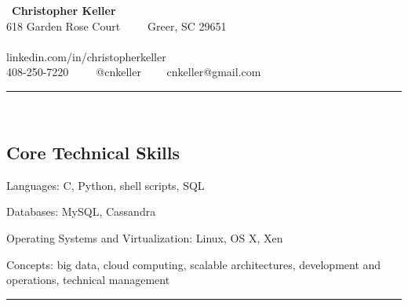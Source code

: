 \documentclass[10pt,letterpaper]{article}
\newenvironment{indentsection}[1]%
{\begin{list}{}%
	{\setlength{\leftmargin}{#1}}%
	\item[]%
}
{\end{list}}
\begin{document}
\begin{center}
{\LARGE\ \textbf{Christopher Keller}}\\
618 Garden Rose Court\ \ \textbullet\
\ \ Greer, SC 29651 \\
~\\
linkedin.com/in/christopherkeller\\
408-250-7220\ \ \textbullet\
\ \ @cnkeller \ \textbullet\
\ \ cnkeller@gmail.com
\end{center}

\hrule\
\vspace{-0.4em}
\subsection*{Core Technical Skills}

\begin{indentsection}{\parindent}
	\begin{description*}
		\item[Languages:]
		C, Python, shell scripts, \textsc{SQL}
		\item[Databases:]
		My\textsc{SQL}, Cassandra
		\item[Operating Systems and Virtualization:]
		Linux, \textsc{OS X}, Xen
		\item[Concepts:]
		big data, cloud computing,  scalable architectures, development and operations, technical management
	\end{description*}
\end{indentsection}
\hrule\
\vspace{-0.4em}
\end{document}
